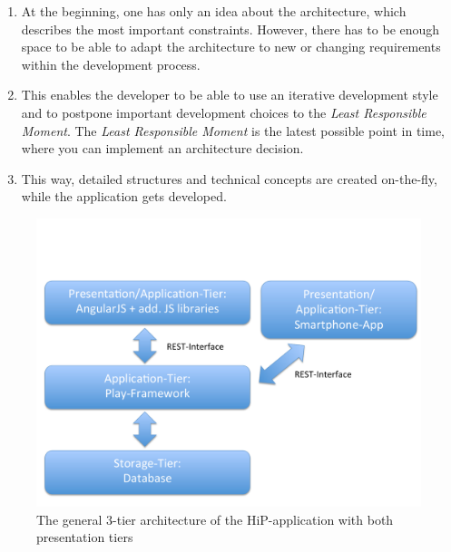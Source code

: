 \begin{enumerate}
	\item At the beginning, one has only an idea about the architecture, which describes the most important constraints. However, there has to be enough space to be able to adapt the architecture to new or changing requirements within the development process.
	\item This enables the developer to be able to use an iterative development style and to postpone important development choices to the \textit{Least Responsible Moment}. The \textit{Least Responsible Moment} is the latest possible point in time, where you can implement an architecture decision.
	\item This way, detailed structures and technical concepts are created on-the-fly, while the application gets developed.
\end{enumerate}

\begin{figure}[th]
\centerline{\includegraphics[width=1\textwidth]{gfx/architecture}}
\caption{The general 3-tier architecture of the HiP-application with both presentation tiers}
\label{hip:architecture}
\end{figure}

